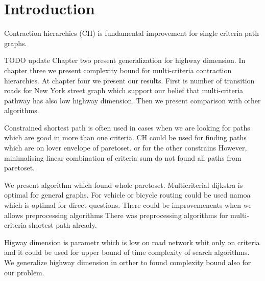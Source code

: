 % 
%  
%  
%  

\section{Introduction}

Contraction hierarchies (CH) \cite{geisberger2008contraction}
is fundamental improvement for single criteria path graphs.

TODO update 
Chapter two present generalization for highway dimension. In chapter
three we present complexity bound for multi-criteria contraction hierarchies.
At chapter four we present our results. First is number of transition roads for
New York street graph which support our belief that multi-criteria pathway
has also low highway dimension.
Then we present comparison with other algorithms.



Constrained shortest path 
\cite{pugliese2013survey} is often used in cases when we are looking for
paths which are good in more than one criteria.
CH could be used for finding 
paths which are on lover envelope of paretoset.
\cite{funke2013polynomial}
or for the other constrains 
However, minimalising linear combination of criteria sum 
do not found all paths from paretoset.

We present algorithm which found whole paretoset.
Multicriterial dijkstra is optimal for general graphs.
For vehicle or bicycle routing could be used namoa
which is optimal for direct questions.
There could be improvemenents when we allows preprocessing
algorithms 
There was preprocessing algorithms for multi-criteria
shortest path already.
\cite{kohler2005acceleration} 

Higway dimension  \cite{abraham2010highway} is parametr which 
is low on road network whit only on criteria
and it could be used for upper bound of time complexity of search 
algorithms. We generalize highway dimension in orther to found 
complexity bound also for our problem.

